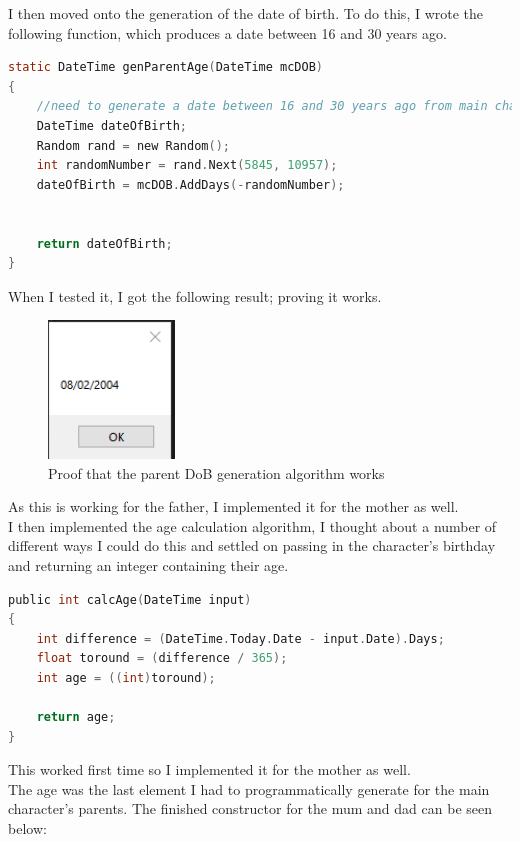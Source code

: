 \noindent I then moved onto the generation of the date of birth. To do this, I wrote the following function, which produces a date between 16 and 30 years ago. 
\begin{lstlisting}[language=c, style=csharp, caption=Function which generates DoB of parent]
static DateTime genParentAge(DateTime mcDOB)
{
    //need to generate a date between 16 and 30 years ago from main character birthday.
    DateTime dateOfBirth;
    Random rand = new Random();
    int randomNumber = rand.Next(5845, 10957);
    dateOfBirth = mcDOB.AddDays(-randomNumber);


    return dateOfBirth;
}
\end{lstlisting}
When I tested it, I got the following result; proving it works.
\begin{figure}[H]
    \centering
    \includegraphics[width=0.3\textwidth]{images/implementation/proofParentAgeGenWorks.png}
    \caption{Proof that the parent DoB generation algorithm works}
    \label{fig:implementation-proofParentAgeGenWorks}
\end{figure}
\noindent As this is working for the father, I implemented it for the mother as well.\\
I then implemented the age calculation algorithm, I thought about a number of different ways I could do this and settled on passing in the character's birthday and returning an integer containing their age.
\begin{lstlisting}[language=c, style=csharp, caption=Age generation algorithm]
public int calcAge(DateTime input)
{
    int difference = (DateTime.Today.Date - input.Date).Days;
    float toround = (difference / 365);
    int age = ((int)toround);

    return age;
}
\end{lstlisting}
This worked first time so I implemented it for the mother as well.\\
The age was the last element I had to programmatically generate for the main character's parents. The finished constructor for the mum and dad can be seen below:

